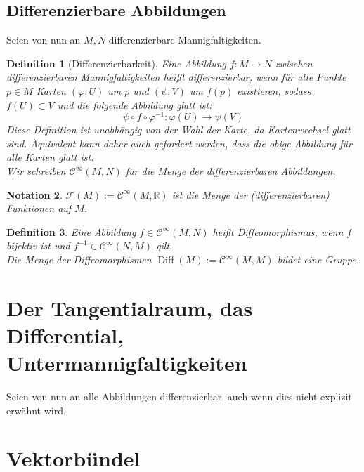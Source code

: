 \documentclass[a4paper]{scrreprt}
\numberwithin{equation}{chapter}
\DeclareMathOperator{\Diff}{Diff}
\newcommand{\R}{\mathds{R}}
\newcommand{\sC}{\mathcal{C}^{\infty}}
\newcommand{\sm}{\mathcal{F}(M)}
\theoremstyle{plain}
\newtheorem{defn}{Definition}[section]
\newtheorem{nota}[defn]{Notation}
\begin{document}
	\section{Differenzierbare Abbildungen}
		Seien von nun an $M,N$ differenzierbare Mannigfaltigkeiten.
		\begin{defn}[Differenzierbarkeit]
			Eine Abbildung $f:M\rightarrow N$ zwischen differenzierbaren Mannigfaltigkeiten heißt differenzierbar, wenn für alle Punkte $p\in M$ Karten $(\varphi,U)$ um  $p$ und $(\psi,V)$ um $f(p)$ existieren, sodass $f(U)\subset V$ und die folgende Abbildung glatt ist:
			\begin{equation}
				\psi\circ f \circ \varphi^{-1}:\varphi(U)\rightarrow \psi(V)
			\end{equation}
			Diese Definition ist unabhängig von der Wahl der Karte, da Kartenwechsel glatt sind. Äquivalent kann daher auch gefordert werden, dass die obige Abbildung für alle Karten glatt ist.\\
			Wir schreiben $\sC(M,N)$ für die Menge der differenzierbaren Abbildungen.
		\end{defn}
		\begin{nota}
			$\sm:=\sC(M,\R)$ ist die Menge der (differenzierbaren) Funktionen auf $M$.
		\end{nota}
		\begin{defn}
			Eine Abbildung $f\in\sC(M,N)$ heißt Diffeomorphismus, wenn $f$ bijektiv ist und $f^{-1}\in\sC(N,M)$ gilt.\\
			Die Menge der Diffeomorphismen $\Diff(M):=\sC(M,M)$ bildet eine Gruppe.
		\end{defn}
\chapter{Der Tangentialraum, das Differential, Untermannigfaltigkeiten}
	Seien von nun an alle Abbildungen differenzierbar, auch wenn dies nicht explizit erwähnt wird.

\chapter{Vektorbündel}
\end{document}
